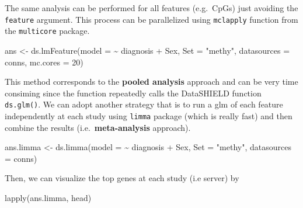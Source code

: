 \documentclass[
]{book}
\newenvironment{Shaded}{\begin{snugshade}}{\end{snugshade}}
\newcommand{\AttributeTok}[1]{\textcolor[rgb]{0.77,0.63,0.00}{#1}}
\newcommand{\DecValTok}[1]{\textcolor[rgb]{0.00,0.00,0.81}{#1}}
\newcommand{\FunctionTok}[1]{\textcolor[rgb]{0.00,0.00,0.00}{#1}}
\newcommand{\NormalTok}[1]{#1}
\newcommand{\OtherTok}[1]{\textcolor[rgb]{0.56,0.35,0.01}{#1}}
\newcommand{\SpecialCharTok}[1]{\textcolor[rgb]{0.00,0.00,0.00}{#1}}
\newcommand{\StringTok}[1]{\textcolor[rgb]{0.31,0.60,0.02}{#1}}
\begin{document}
The same analysis can be performed for all features (e.g.~CpGs) just avoiding the \texttt{feature} argument. This process can be parallelized using \texttt{mclapply} function from the \texttt{multicore} package.

\begin{Shaded}
\begin{Highlighting}[]
\NormalTok{ans }\OtherTok{\textless{}{-}} \FunctionTok{ds.lmFeature}\NormalTok{(}\AttributeTok{model =} \SpecialCharTok{\textasciitilde{}}\NormalTok{ diagnosis }\SpecialCharTok{+}\NormalTok{ Sex, }
                    \AttributeTok{Set =} \StringTok{"methy"}\NormalTok{,}
                    \AttributeTok{datasources =}\NormalTok{ conns,}
                    \AttributeTok{mc.cores =} \DecValTok{20}\NormalTok{)}
\end{Highlighting}
\end{Shaded}

This method corresponds to the \textbf{pooled analysis} approach and can be very time consiming since the function repeatedly calls the DataSHIELD function \texttt{ds.glm()}. We can adopt another strategy that is to run a glm of each feature independently at each study using \texttt{limma} package (which is really fast) and then combine the results (i.e.~\textbf{meta-analysis} approach).

\begin{Shaded}
\begin{Highlighting}[]
\NormalTok{ans.limma }\OtherTok{\textless{}{-}} \FunctionTok{ds.limma}\NormalTok{(}\AttributeTok{model =} \SpecialCharTok{\textasciitilde{}}\NormalTok{ diagnosis }\SpecialCharTok{+}\NormalTok{ Sex,}
                      \AttributeTok{Set =} \StringTok{"methy"}\NormalTok{, }
                      \AttributeTok{datasources =}\NormalTok{ conns)}
\end{Highlighting}
\end{Shaded}

Then, we can visualize the top genes at each study (i.e server) by

\begin{Shaded}
\begin{Highlighting}[]
\FunctionTok{lapply}\NormalTok{(ans.limma, head)}
\end{Highlighting}
\end{Shaded}
\end{document}
